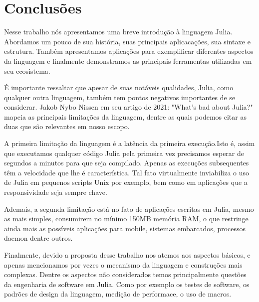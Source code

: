 %



\chapter{Conclus\~{o}es}

Nesse trabalho nós apresentamos uma breve introdução à linguagem Julia. Abordamos um pouco de sua história, suas principais aplicacações, sua sintaxe e estrutura. Também apresentamos aplicações para exemplificar diferentes aspectos da linguagem e finalmente demonstramos as principais ferramentas utilizadas em seu ecosistema. 

É importante ressaltar que apesar de suas notáveis qualidades, Julia, como qualquer outra linguagem, também tem pontos negativos importantes de se considerar. Jakob Nybo Nissen em seu artigo de 2021: "What's bad about Julia?"\cite{Nissen2021} mapeia as principais limitações da linguagem, dentre as quais podemos citar as duas que são relevantes em nosso escopo.

A primeira limitação da linguagem é a latência da primeira execução.Isto é, assim que executamos qualquer código Julia pela primeira vez precisamos esperar de segundos a minutos para que seja compilado. Apenas as execuções subsequentes têm a velocidade que lhe é característica. Tal fato virtualmente inviabiliza o uso de Julia em pequenos scripts Unix por exemplo, bem como em aplicações que a responsividade seja sempre chave.

Ademais, a segunda limitação está no fato de aplicações escritas em Julia, mesmo as mais simples, consumirem no mínimo 150MB memória RAM, o que restringe ainda mais as possíveis aplicações para mobile, sistemas embarcados, processos daemon dentre outros.  

Finalmente, devido a proposta desse trabalho nos atemos aos aspectos básicos, e apenas mencionamos por vezes o mecanismo da linguagem e construções mais complexas. 
Dentre os aspectos não considerados temos principalmente questões da engenharia de software em Julia. Como por exemplo os testes de software, os padrões de design da linguagem, medição de performace, o uso de macros. 

